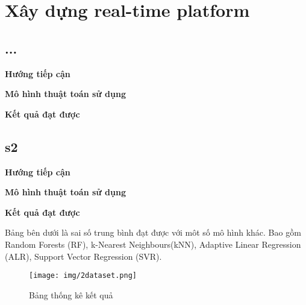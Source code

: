 \chapter{Xây dựng real-time platform}



\section{...
 \cite{9direction}}
\textbf{Hướng tiếp cận}



\textbf{Mô hình thuật toán sử dụng}



\textbf{Kết quả đạt được}
\section{s2 \cite{appearance}}

\textbf{Hướng tiếp cận}

\textbf{Mô hình thuật toán sử dụng}

\newpage
\textbf{Kết quả đạt được}

Bảng bên dưới là  sai số trung bình đạt được với môt số mô hình khác. Bao gồm Random Forests (RF), k-Nearest Neighbours(kNN), Adaptive Linear Regression (ALR), Support Vector Regression (SVR).
\begin{center}
    \begin{figure}[h!]
    \begin{center}
     \texttt{[image: img/2dataset.png]}
    \end{center}
    \caption{Bảng thống kê kết quả}
    \label{refhinh20}
    \end{figure}
\end{center}
